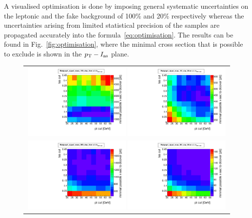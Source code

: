 A visualised optimisation is done by imposing general systematic uncertainties on the leptonic and the fake background of 100\% and 20\% respectively whereas
the uncertainties arising from limited statistical precision of the samples are propagated accurately into the formula~\ref{eq:optimisation}.
The results can be found in Fig.~\ref{fig:optimisation}, where the minimal cross section that is possible to exclude is shown in the $p_{\text{T}}-I_{\text{as}}$ plane.
\begin{figure}[!h]
  \centering 
  \begin{tabular}{c}
    \includegraphics[width=0.49\textwidth]{figures/analysis/Optimisation/Madgraph_signal_mass_100_ctau_5cm_ECaloLe5_SOverDeltaBStatPlusSys.pdf} 
    \includegraphics[width=0.49\textwidth]{figures/analysis/Optimisation/Madgraph_signal_mass_100_ctau_50cm_ECaloLe5_SOverDeltaBStatPlusSys.pdf}\\ 
    \includegraphics[width=0.49\textwidth]{figures/analysis/Optimisation/Madgraph_signal_mass_500_ctau_5cm_ECaloLe5_SOverDeltaBStatPlusSys.pdf}
    \includegraphics[width=0.49\textwidth]{figures/analysis/Optimisation/Madgraph_signal_mass_500_ctau_50cm_ECaloLe5_SOverDeltaBStatPlusSys.pdf} 

\end{tabular}
\end{figure}
